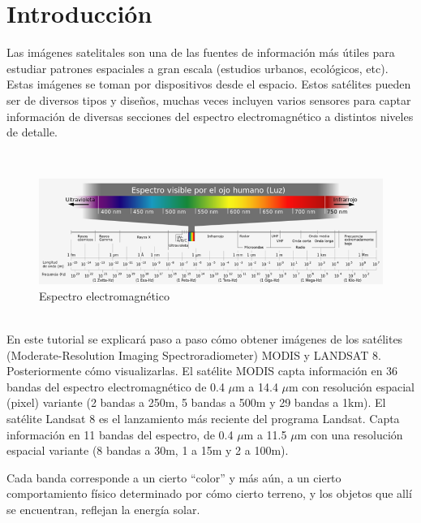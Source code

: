 
\section{Introducción}
Las imágenes satelitales son una de las fuentes de información más útiles para estudiar patrones espaciales a gran escala (estudios urbanos, ecológicos, etc). Estas imágenes se toman por dispositivos desde el espacio. Estos satélites pueden ser de diversos tipos y diseños, muchas veces incluyen varios sensores para captar información de diversas secciones del espectro electromagnético a distintos niveles de detalle.

\\

\begin{figure}[h!]
\begin{center}
\leavevmode
\includegraphics[width=5in]{1_espectro.png}
\end{center}
\caption{Espectro electromagnético}
\end{figure}

\\

 En este tutorial se explicará paso a paso cómo obtener imágenes de los satélites (Moderate-Resolution Imaging Spectroradiometer) MODIS y LANDSAT 8. Posteriormente cómo visualizarlas. El satélite MODIS capta información en 36 bandas del espectro electromagnético de 0.4 $\mu$m a 14.4 $\mu$m con resolución espacial (pixel) variante (2 bandas a 250m, 5 bandas a 500m y 29 bandas a 1km). El satélite Landsat 8 es el lanzamiento más reciente del programa Landsat. Capta información en 11 bandas del espectro, de 0.4 $\mu$m a 11.5 $\mu$m con una resolución espacial variante (8 bandas a 30m, 1 a 15m y 2 a 100m).

\newpage

Cada banda corresponde a un cierto "`color"' y más aún, a un cierto comportamiento físico determinado por cómo cierto terreno, y los objetos que allí se encuentran, reflejan la energía solar.

\\

